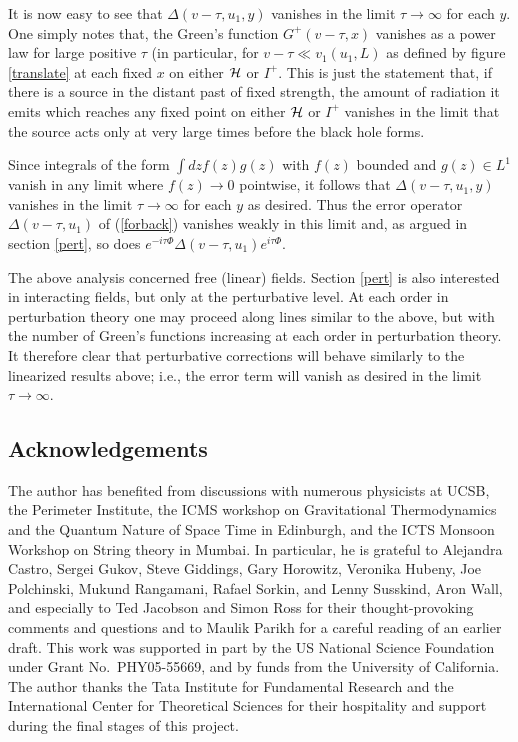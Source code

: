 \documentclass[12pt,onecolumn,eqsecnum,aps,prd,nofootinbib]{revtex4}
\begin{document}
It is now easy to see that $\Delta(v - \tau, u_1, y )$ vanishes in the limit $\tau \rightarrow \infty$ for each $y$.  One simply notes that, the Green's function $ G^+(v-\tau, x) $ vanishes as a power law for large positive $\tau$ (in particular, for $v - \tau \ll v_1(u_1, L)$ as defined by figure \ref{translate} at each fixed $x$ on either ${\cal H}$ or $I^+$.  This is just the statement that, if there is a source in the distant past of fixed strength, the amount of radiation it emits which reaches any fixed point on either ${\cal H}$ or $I^+$ vanishes in the limit that the source acts only at very large times before the black hole forms. 


Since integrals of the form $\int dz f(z) g(z)$ with $f(z)$ bounded and $g(z) \in L^1$ vanish in any limit where $f(z) \rightarrow 0$ pointwise, it follows that $\Delta(v - \tau, u_1, y )$ vanishes in the limit $\tau \rightarrow \infty$ for each $y$ as desired.    Thus the error operator  $\Delta(v - \tau, u_1)$ of (\ref{forback}) vanishes weakly in this limit and, as argued in section \ref{pert}, so does 
$e^{-i \tau \Phi} \Delta (v-\tau,u_1)e^{i \tau \Phi}$.


The above analysis concerned free (linear) fields.  Section \ref{pert} is also interested in interacting fields, but only at the perturbative level.  At each order in perturbation theory one may proceed along lines similar to the above, but with the number of Green's functions increasing at each order in perturbation theory.  It therefore clear that perturbative corrections will behave similarly to the linearized results above; i.e., the error term will vanish as desired in the limit $\tau \rightarrow \infty$.




\subsection*{Acknowledgements}
The author has benefited from discussions with numerous physicists
at UCSB, the Perimeter Institute, the ICMS workshop on Gravitational
Thermodynamics and the Quantum Nature of Space Time in Edinburgh,
and the ICTS Monsoon Workshop on String theory in Mumbai.  In
particular, he is grateful to Alejandra Castro, Sergei Gukov, Steve
Giddings, Gary Horowitz, Veronika Hubeny, Joe Polchinski, Mukund
Rangamani, Rafael Sorkin, and Lenny Susskind, Aron Wall, and
especially to Ted Jacobson and Simon Ross for their
thought-provoking comments and questions and to Maulik Parikh for a
careful reading of an earlier draft. This work was supported in part
by the US National Science Foundation under Grant No.~PHY05-55669,
and by funds from the University of California. The author thanks
the Tata Institute for Fundamental Research and the International
Center for Theoretical Sciences for their hospitality and support
during the final stages of this project.
\end{document}
